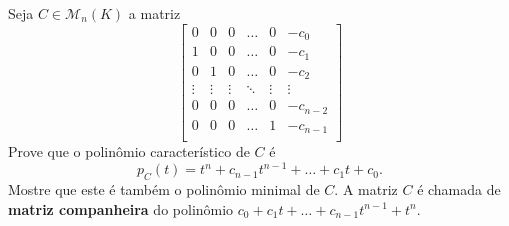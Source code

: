 \documentclass[11pt,a4paper]{article}
\begin{document}
 Seja $C \in \mathcal{M}_n(K)$ a matriz
\[
\begin{bmatrix}
0& 0 & 0 & \ldots & 0 & -c_0 \\ 
1& 0 & 0 & \ldots & 0 & -c_1 \\ 
0& 1 & 0 & \ldots & 0 & -c_2 \\ 
\vdots& \vdots & \vdots & \ddots & \vdots & \vdots \\ 
0& 0 & 0 & \ldots & 0 & -c_{n-2} \\ 
0& 0 & 0 & \ldots & 1 & -c_{n-1} \\ 
\end{bmatrix}
\]
Prove que o polinômio característico de $C$ é 
\[
p_C(t) = t^n + c_{n-1}t^{n-1} + \ldots + c_1t + c_0.
\]
Mostre que este é também o polinômio minimal de $C.$ A matriz $C$ é chamada de \textbf{matriz companheira} do polinômio $c_0 + c_1t + \ldots + c_{n-1}t^{n-1} + t^n.$
\end{document}
